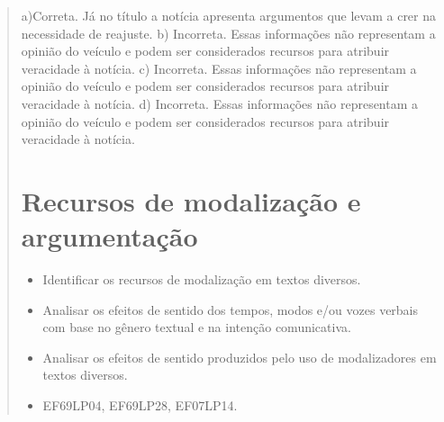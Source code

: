\begin{quote}
{a)Correta. Já no título a notícia apresenta argumentos que levam a crer na
necessidade de reajuste.
b) Incorreta. Essas informações não representam a opinião do veículo e 
podem ser considerados recursos para atribuir veracidade à notícia.
c) Incorreta. Essas informações não representam a opinião do veículo e 
podem ser considerados recursos para atribuir veracidade à notícia.
d) Incorreta. Essas informações não representam a opinião do veículo e 
podem ser considerados recursos para atribuir veracidade à notícia.}

\chapter{Recursos de modalização e argumentação}


\begin{itemize}

  \item Identificar os recursos de modalização em textos diversos.

  \item Analisar os efeitos de sentido dos tempos, modos e/ou vozes 
verbais com base no gênero textual e na intenção comunicativa.

  \item Analisar os efeitos de sentido produzidos pelo uso de modalizadores em textos diversos.

\end{itemize}


\begin{itemize}

  \item EF69LP04, EF69LP28, EF07LP14.

\end{itemize}

\end{quote}
